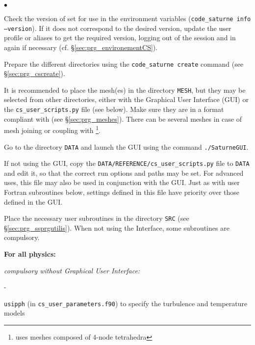 {{{{{\begin{list}{$\bullet$}{}

\item Check the version of \CS set for use in the environment variables
(\texttt{code\_saturne~info --version}). If it does not correspond to
the desired version, update the user profile or aliases to get the
required version, logging out of the session and in again if necessary (cf.
\S\ref{sec:prg_environementCS}).

\item Prepare the different directories using the \texttt{code\_saturne~create}
command (see \S\ref{sec:prg_cscreate}).

\item It is recommended to place the mesh(es) in the directory \texttt{MESH},
but they may be selected from other directories, either with the Graphical User Interface (GUI)
 or the \texttt{cs\_user\_scripts.py} file (see below). Make sure they are
in a format compliant with \CS (see \S\ref{sec:prg_meshes}). There can be
several meshes in case of mesh joining or coupling with
\syrthes\footnote{ uses meshes composed of 4-node tetrahedra}.

\item Go to the directory \texttt{DATA} and launch the
      GUI using the command \texttt{./SaturneGUI}.

\item If not using the GUI, copy the
  \texttt{DATA/REFERENCE/cs\_user\_scripts.py} file to \texttt{DATA} and
  edit it, so that the correct run options and paths may be set. For advanced
  uses, this file may also be used in conjunction with the GUI. Just as with
  user Fortran subroutines below, settings defined in this file have priority
  over those defined in the GUI.

\item Place the necessary user subroutines in the directory \texttt{SRC} (see
\S\ref{sec:prg_ssprgutilis}). When not using the Interface, some subroutines are
compulsory.

\begin{list}{}{}

\item {\bf For all physics:}

    \begin{list}{}{}
        \item {\em compulsory without Graphical User Interface:}
        \begin{list}{-}{}
            \item \texttt{usipph} (in \texttt{cs\_user\_parameters.f90}) to
              specify the turbulence and temperature models


\end{list}
\end{list}
\end{list}
\end{list}}}}}}
